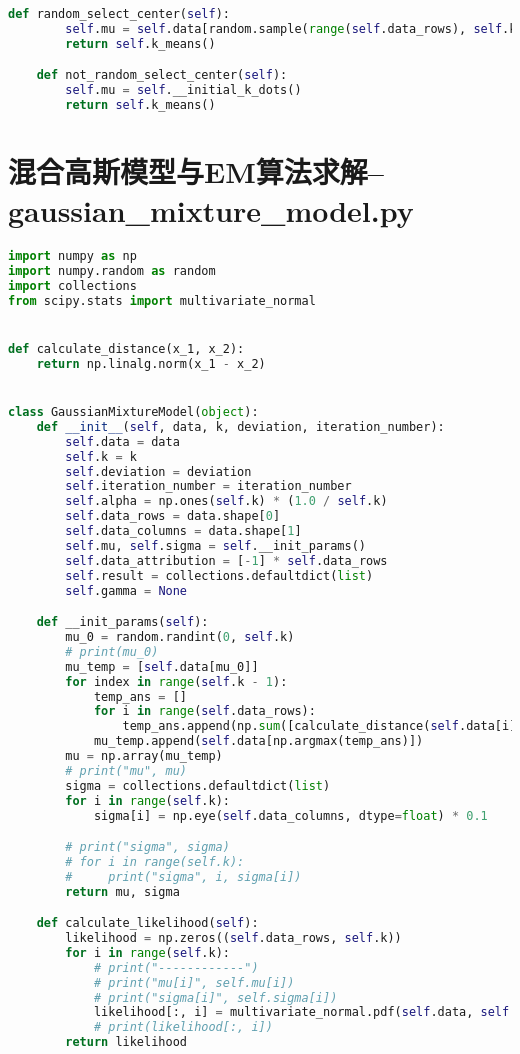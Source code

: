 \documentclass{hitreport}
\begin{document}
\begin{appendices}
\begin{lstlisting}[language=python]
    def random_select_center(self):
        self.mu = self.data[random.sample(range(self.data_rows), self.k)]
        return self.k_means()

    def not_random_select_center(self):
        self.mu = self.__initial_k_dots()
        return self.k_means()

\end{lstlisting}

\section{混合高斯模型与EM算法求解--gaussian\_mixture\_model.py}\label{app:gmm}
\begin{lstlisting}[language=python]
import numpy as np
import numpy.random as random
import collections
from scipy.stats import multivariate_normal


def calculate_distance(x_1, x_2):
    return np.linalg.norm(x_1 - x_2)


class GaussianMixtureModel(object):
    def __init__(self, data, k, deviation, iteration_number):
        self.data = data
        self.k = k
        self.deviation = deviation
        self.iteration_number = iteration_number
        self.alpha = np.ones(self.k) * (1.0 / self.k)
        self.data_rows = data.shape[0]
        self.data_columns = data.shape[1]
        self.mu, self.sigma = self.__init_params()
        self.data_attribution = [-1] * self.data_rows
        self.result = collections.defaultdict(list)
        self.gamma = None

    def __init_params(self):
        mu_0 = random.randint(0, self.k)
        # print(mu_0)
        mu_temp = [self.data[mu_0]]
        for index in range(self.k - 1):
            temp_ans = []
            for i in range(self.data_rows):
                temp_ans.append(np.sum([calculate_distance(self.data[i], mu_temp[j]) for j in range(len(mu_temp))]))
            mu_temp.append(self.data[np.argmax(temp_ans)])
        mu = np.array(mu_temp)
        # print("mu", mu)
        sigma = collections.defaultdict(list)
        for i in range(self.k):
            sigma[i] = np.eye(self.data_columns, dtype=float) * 0.1

        # print("sigma", sigma)
        # for i in range(self.k):
        #     print("sigma", i, sigma[i])
        return mu, sigma

    def calculate_likelihood(self):
        likelihood = np.zeros((self.data_rows, self.k))
        for i in range(self.k):
            # print("------------")
            # print("mu[i]", self.mu[i])
            # print("sigma[i]", self.sigma[i])
            likelihood[:, i] = multivariate_normal.pdf(self.data, self.mu[i], self.sigma[i])
            # print(likelihood[:, i])
        return likelihood


\end{lstlisting}
\end{appendices}
\end{document}

